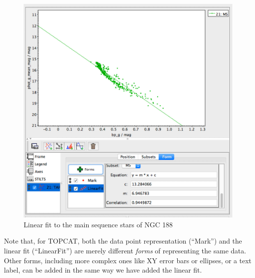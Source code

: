 \documentclass[twocolumn,apj]{openjournal}
\begin{document}
\begin{figure}[htbp]
\begin{center}
\includegraphics[width=\linewidth]{ngc188MainFit.jpg}
\caption{Linear fit to the main sequence stars of NGC 188}
\label{ngc188MainFit}
\end{center}
\end{figure}
Note that, for TOPCAT, both the data point representation (``Mark'') and the linear fit (``LinearFit'') are merely different {\em forms} of representing the same data. Other forms, including more complex ones like XY error bars or ellipses, or a text label, can be added in the same way we have added the linear fit.
\end{document}
